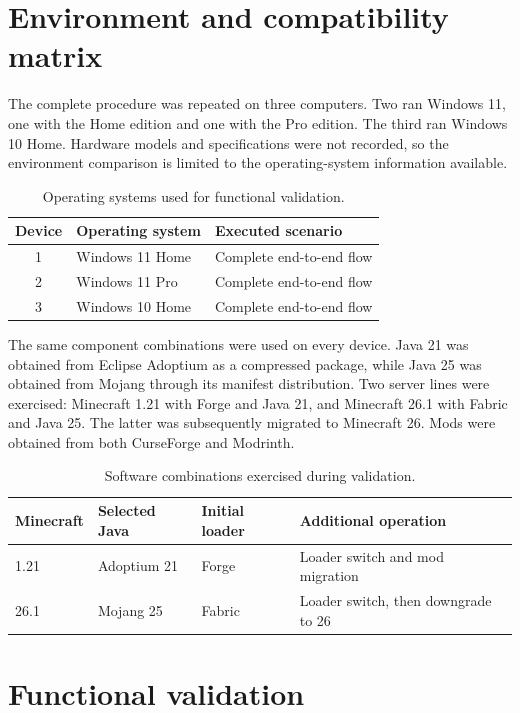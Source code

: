 \section{Environment and compatibility matrix}

The complete procedure was repeated on three computers. Two ran Windows 11, one with the Home edition and one with the Pro edition. The third ran Windows 10 Home. Hardware models and specifications were not recorded, so the environment comparison is limited to the operating-system information available.

\begin{table}[htbp]
\centering
\caption{Operating systems used for functional validation.}
\label{tab:test-environments}
\begin{tabularx}{\textwidth}{cXX}
\toprule
Device & Operating system & Executed scenario \\
\midrule
1 & Windows 11 Home & Complete end-to-end flow \\
2 & Windows 11 Pro & Complete end-to-end flow \\
3 & Windows 10 Home & Complete end-to-end flow \\
\bottomrule
\end{tabularx}
\end{table}

The same component combinations were used on every device. Java 21 was obtained from Eclipse Adoptium as a compressed package, while Java 25 was obtained from Mojang through its manifest distribution. Two server lines were exercised: Minecraft 1.21 with Forge and Java 21, and Minecraft 26.1 with Fabric and Java 25. The latter was subsequently migrated to Minecraft 26. Mods were obtained from both CurseForge and Modrinth.

\begin{table}[htbp]
\centering
\caption{Software combinations exercised during validation.}
\label{tab:compatibility-matrix}
\small
\begin{tabularx}{\textwidth}{XXXX}
\toprule
Minecraft & Selected Java & Initial loader & Additional operation \\
\midrule
1.21 & Adoptium 21 & Forge & Loader switch and mod migration \\
26.1 & Mojang 25 & Fabric & Loader switch, then downgrade to 26 \\
\bottomrule
\end{tabularx}
\end{table}

\section{Functional validation}

